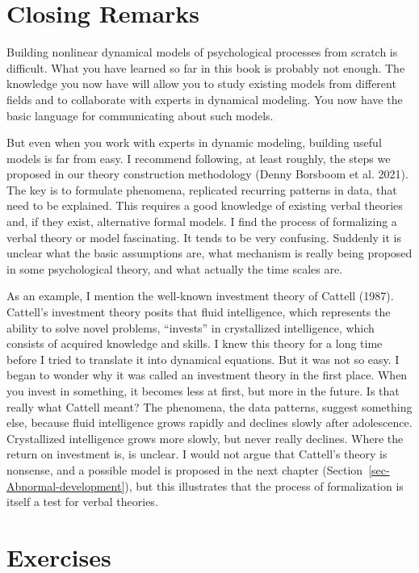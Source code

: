\documentclass[
  a4paper,
  DIV=11,
  numbers=noendperiod]{scrreprt}
\begin{document}
\hypertarget{sec-Closing-Remarks}{%
\section{Closing Remarks}\label{sec-Closing-Remarks}}

Building nonlinear dynamical models of psychological processes from
scratch is difficult. What you have learned so far in this book is
probably not enough. The knowledge you now have will allow you to study
existing models from different fields and to collaborate with experts in
dynamical modeling. You now have the basic language for communicating
about such models.

But even when you work with experts in dynamic modeling, building useful
models is far from easy. I recommend following, at least roughly, the
steps we proposed in our theory construction methodology (Denny Borsboom
et al. 2021). The key is to formulate phenomena, replicated recurring
patterns in data, that need to be explained. This requires a good
knowledge of existing verbal theories and, if they exist, alternative
formal models. I find the process of formalizing a verbal theory or
model fascinating. It tends to be very confusing. Suddenly it is unclear
what the basic assumptions are, what mechanism is really being proposed
in some psychological theory, and what actually the time scales are.

As an example, I mention the well-known investment theory of Cattell
(1987). Cattell's investment theory posits that fluid intelligence,
which represents the ability to solve novel problems, ``invests'' in
crystallized intelligence, which consists of acquired knowledge and
skills. I knew this theory for a long time before I tried to translate
it into dynamical equations. But it was not so easy. I began to wonder
why it was called an investment theory in the first place. When you
invest in something, it becomes less at first, but more in the future.
Is that really what Cattell meant? The phenomena, the data patterns,
suggest something else, because fluid intelligence grows rapidly and
declines slowly after adolescence. Crystallized intelligence grows more
slowly, but never really declines. Where the return on investment is, is
unclear. I would not argue that Cattell's theory is nonsense, and a
possible model is proposed in the next chapter
(Section~\ref{sec-Abnormal-development}), but this illustrates that the
process of formalization is itself a test for verbal theories.

\hypertarget{sec-Exercises}{%
\section{Exercises}\label{sec-Exercises}}
\end{document}
